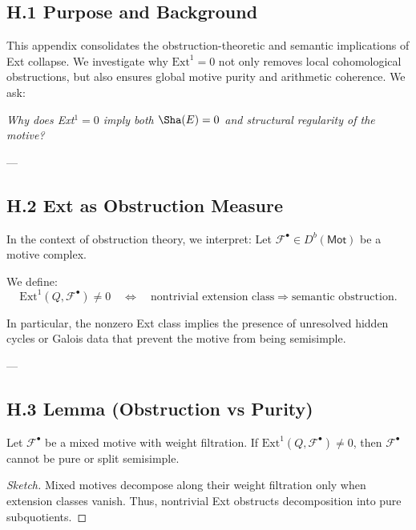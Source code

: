 \subsection*{H.1 Purpose and Background}

This appendix consolidates the obstruction-theoretic and semantic implications of Ext collapse.  
We investigate why \( \mathrm{Ext}^1 = 0 \) not only removes local cohomological obstructions, but also ensures global motive purity and arithmetic coherence.  
We ask:

\begin{center}
\textit{Why does Ext$^1 = 0$ imply both $\Sha(E) = 0$ and structural regularity of the motive?}
\end{center}

---

\subsection*{H.2 Ext as Obstruction Measure}

In the context of obstruction theory, we interpret:
Let \( \mathcal{F}^\bullet \in D^b(\mathsf{Mot}) \) be a motive complex.

\begin{definition}
We define:
\[
\mathrm{Ext}^1(Q, \mathcal{F}^\bullet) \neq 0 \quad \Leftrightarrow \quad 
\text{nontrivial extension class} \Rightarrow \text{semantic obstruction}.
\]
\end{definition}

In particular, the nonzero Ext class implies the presence of unresolved hidden cycles or Galois data  
that prevent the motive from being semisimple.

---

\subsection*{H.3 Lemma (Obstruction vs Purity)}

\begin{lemma}
Let \( \mathcal{F}^\bullet \) be a mixed motive with weight filtration.  
If \( \mathrm{Ext}^1(Q, \mathcal{F}^\bullet) \neq 0 \), then \( \mathcal{F}^\bullet \) cannot be pure or split semisimple.
\end{lemma}

\begin{proof}[Sketch]
Mixed motives decompose along their weight filtration only when extension classes vanish.  
Thus, nontrivial Ext obstructs decomposition into pure subquotients.
\end{proof}

